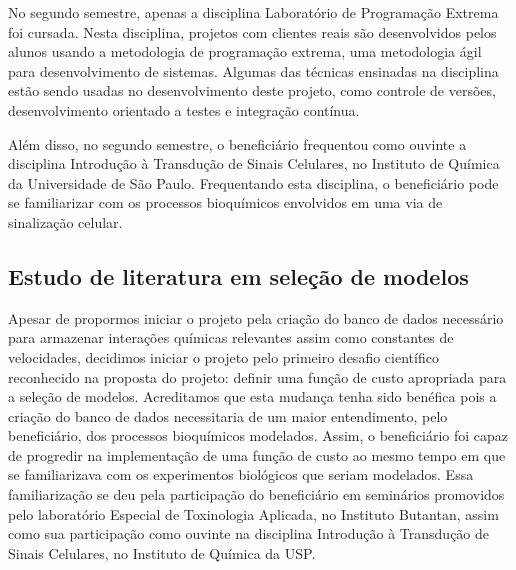 \documentclass[12pt]{article}
\begin{document}
No segundo semestre, apenas a disciplina Laboratório de Programação 
Extrema foi cursada. Nesta disciplina, projetos com clientes reais são
desenvolvidos pelos alunos usando a metodologia de programação extrema, 
uma metodologia ágil para desenvolvimento de sistemas. Algumas das 
técnicas ensinadas na disciplina estão sendo usadas no desenvolvimento
deste projeto, como controle de versões, desenvolvimento orientado a 
testes e integração contínua. 

Além disso, no segundo semestre, o beneficiário frequentou como ouvinte
a disciplina Introdução à Transdução de Sinais Celulares, no Instituto 
de Química da Universidade de São Paulo. Frequentando esta disciplina,
o beneficiário pode se familiarizar com os processos bioquímicos 
envolvidos em uma via de sinalização celular.

\subsection{Estudo de literatura em seleção de modelos}\label{model_sel}


Apesar de propormos iniciar o projeto pela criação do banco de dados
necessário para armazenar interações químicas relevantes assim como 
constantes de velocidades, decidimos iniciar o projeto pelo primeiro
desafio científico reconhecido na proposta do projeto: definir uma 
função de custo apropriada para a seleção de modelos. Acreditamos que 
esta mudança tenha sido benéfica pois a criação do banco de dados 
necessitaria de um maior entendimento, pelo beneficiário, dos processos
bioquímicos modelados. Assim, o beneficiário foi capaz de progredir
na implementação de uma função de custo ao mesmo tempo em que se 
familiarizava com os experimentos biológicos que seriam modelados. 
Essa familiarização se deu pela participação do beneficiário em 
seminários promovidos pelo laboratório Especial de Toxinologia Aplicada,
no Instituto Butantan, assim como sua participação como ouvinte na 
disciplina Introdução à Transdução de Sinais Celulares, no Instituto de
Química da USP.
\end{document}
